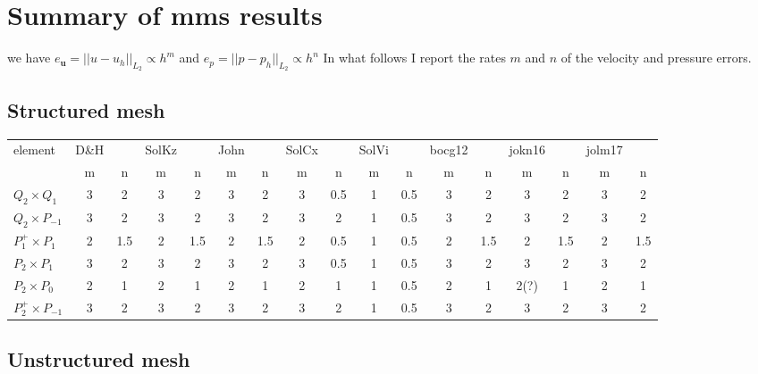 \newpage
\section*{Summary of mms results}


we have $e_{\bm u}=||u-u_h||_{L_2} \propto h^m$ and $e_p=||p-p_h||_{L_2} \propto h^n$
In what follows I report the rates $m$ and $n$ of the velocity and pressure errors.

\subsection*{Structured mesh}

\begin{footnotesize}
\begin{center}
\begin{tabular}{|l|cc|cc|cc|cc|cc|cc|cc|cc|}
\hline
element           & D\&H && SolKz  &&  John  && SolCx &&  SolVi && bocg12&& jokn16 && jolm17 &\\
                      & m&n& m&n& m&n& m&n& m&n   & m&n &m&n &m&n\\
$Q_2\times Q_1$       & 3&2    & 3&2     & 3&2    & 3&0.5   & 1 & 0.5 & 3&2   & 3&2    &3&2 \\ 
$Q_2\times P_{-1}$    & 3&2    & 3&2     & 3&2    & 3&2     & 1 & 0.5 & 3&2   & 3&2    &3&2 \\ 
$P_1^+\times P_{1}$   & 2&1.5  & 2&1.5   & 2&1.5  & 2&0.5   & 1 & 0.5 & 2&1.5 & 2&1.5  &2&1.5 \\ 
$P_2\times P_1$       & 3&2    & 3&2     & 3&2    & 3&0.5   & 1 & 0.5 & 3&2   & 3&2    &3&2 \\ 
$P_2\times P_0$       & 2&1    & 2&1     & 2&1    & 2&1     & 1 & 0.5 & 2&1   & 2(?)&1 &2&1 \\ 
$P_2^+\times P_{-1}$  & 3&2    & 3&2     & 3&2    & 3&2     & 1 & 0.5 & 3&2   & 3&2    &3&2 \\ 
\hline
\end{tabular}
\end{center}
\end{footnotesize}

\subsection*{Unstructured mesh}

